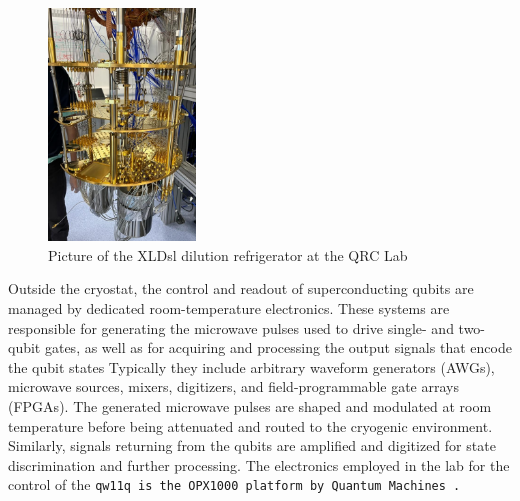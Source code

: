 \begin{figure}[h!]
    \centering
    \includegraphics[width=0.35\textwidth]{figures/png/XLD1000.png}
    \caption{Picture of the XLDsl dilution refrigerator at the QRC Lab}
    \label{fig:XLDsl}
\end{figure}

Outside the cryostat, the control and readout of superconducting qubits are managed by dedicated room-temperature electronics.
These systems are responsible for generating the microwave pulses used to drive single- and two-qubit gates, as well as for acquiring and processing the output signals that encode the qubit states 
Typically they include arbitrary waveform generators (AWGs), microwave sources, mixers, digitizers, and field-programmable gate arrays (FPGAs).
The generated microwave pulses are shaped and modulated at room temperature before being attenuated and routed to the cryogenic environment. 
Similarly, signals returning from the qubits are amplified and digitized for state discrimination and further processing. 
The electronics employed in the lab for the control of the \tt{qw11q} is the OPX1000 platform by Quantum Machines \cite{opx1000}.

